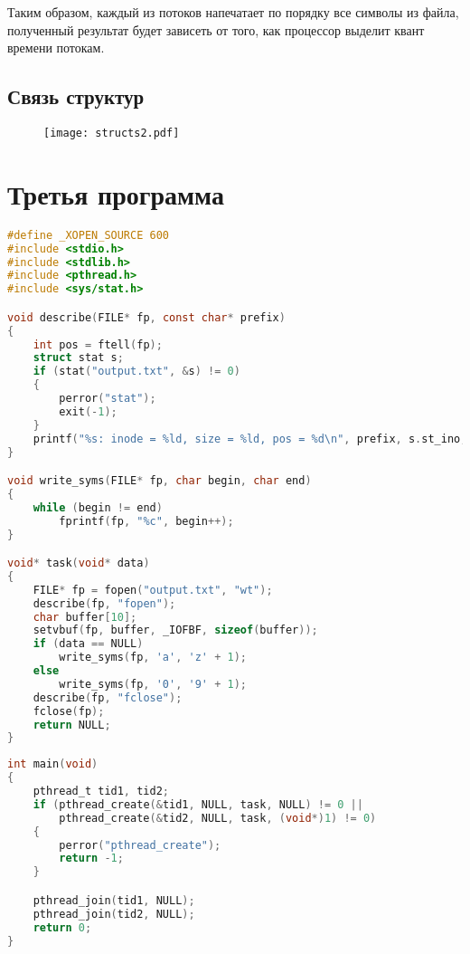Таким образом, каждый из потоков напечатает по порядку все символы из файла, полученный результат будет зависеть от того, как процессор выделит квант времени потокам.

\clearpage

\section*{Связь структур}

\begin{figure}[ht]
    \centering
    \texttt{[image: structs2.pdf]}
\end{figure}

\chapter{Третья программа}

\begin{lstlisting}[language=C]
#define _XOPEN_SOURCE 600
#include <stdio.h>
#include <stdlib.h>
#include <pthread.h>
#include <sys/stat.h>

void describe(FILE* fp, const char* prefix)
{
    int pos = ftell(fp);
    struct stat s;
    if (stat("output.txt", &s) != 0)
    {
        perror("stat");
        exit(-1);
    }
    printf("%s: inode = %ld, size = %ld, pos = %d\n", prefix, s.st_ino, s.st_size, pos);
}

void write_syms(FILE* fp, char begin, char end)
{
    while (begin != end)
        fprintf(fp, "%c", begin++);
}

void* task(void* data)
{
    FILE* fp = fopen("output.txt", "wt");
    describe(fp, "fopen");
    char buffer[10];
    setvbuf(fp, buffer, _IOFBF, sizeof(buffer));
    if (data == NULL)
        write_syms(fp, 'a', 'z' + 1);
    else
        write_syms(fp, '0', '9' + 1);
    describe(fp, "fclose");
    fclose(fp);
    return NULL;
}
\end{lstlisting}

\clearpage

\begin{lstlisting}[language=C,firstnumber=39]
int main(void)
{
    pthread_t tid1, tid2;
    if (pthread_create(&tid1, NULL, task, NULL) != 0 ||
        pthread_create(&tid2, NULL, task, (void*)1) != 0)
    {
        perror("pthread_create");
        return -1;
    }

    pthread_join(tid1, NULL);
    pthread_join(tid2, NULL);
    return 0;
}
\end{lstlisting}

